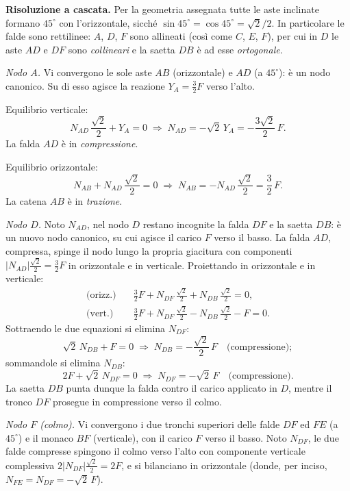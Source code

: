 \begin{esempio}
\begin{svolgimento}
		\noindent\textbf{Risoluzione a cascata.}
		Per la geometria assegnata tutte le aste inclinate
		formano $45^\circ$ con l'orizzontale, sicché
		$\sin 45^\circ = \cos 45^\circ = \sqrt2/2$. In
		particolare le falde sono rettilinee: $A$, $D$, $F$
		sono allineati (così come $C$, $E$, $F$), per cui in
		$D$ le aste $AD$ e $DF$ sono \emph{collineari} e la
		saetta $DB$ è ad esse \emph{ortogonale}.
		
		\textit{Nodo $A$.}
		Vi convergono le sole aste $AB$ (orizzontale) e
		$AD$ (a $45^\circ$): è un nodo canonico. Su di esso
		agisce la reazione $Y_A = \tfrac{3}{2}F$ verso l'alto.
		
		Equilibrio verticale:
		\[
		N_{AD}\,\frac{\sqrt2}{2} + Y_A = 0
		\;\Rightarrow\;
		N_{AD} = -\sqrt2\,Y_A
		= -\frac{3\sqrt2}{2}\,F.
		\]
		La falda $AD$ è in \emph{compressione}.
		
		Equilibrio orizzontale:
		\[
		N_{AB} + N_{AD}\,\frac{\sqrt2}{2} = 0
		\;\Rightarrow\;
		N_{AB} = -N_{AD}\,\frac{\sqrt2}{2}
		= \frac{3}{2}\,F.
		\]
		La catena $AB$ è in \emph{trazione}.
		
		\textit{Nodo $D$.}
		Noto $N_{AD}$, nel nodo $D$ restano incognite la
		falda $DF$ e la saetta $DB$: è un nuovo nodo canonico,
		su cui agisce il carico $F$ verso il basso. La falda
		$AD$, compressa, spinge il nodo lungo la propria
		giacitura con componenti
		$\lvert N_{AD}\rvert \tfrac{\sqrt2}{2} = \tfrac{3}{2}F$
		in orizzontale e in verticale. Proiettando in
		orizzontale e in verticale:
		\[
		\begin{aligned}
			\text{(orizz.)}\quad
			&\tfrac{3}{2}F + N_{DF}\,\tfrac{\sqrt2}{2}
			+ N_{DB}\,\tfrac{\sqrt2}{2} = 0,\\[2pt]
			\text{(vert.)}\quad
			&\tfrac{3}{2}F + N_{DF}\,\tfrac{\sqrt2}{2}
			- N_{DB}\,\tfrac{\sqrt2}{2} - F = 0.
		\end{aligned}
		\]
		Sottraendo le due equazioni si elimina $N_{DF}$:
		\[
		\sqrt2\,N_{DB} + F = 0
		\;\Rightarrow\;
		N_{DB} = -\frac{\sqrt2}{2}\,F
		\quad\text{(compressione)};
		\]
		sommandole si elimina $N_{DB}$:
		\[
		2F + \sqrt2\,N_{DF} = 0
		\;\Rightarrow\;
		N_{DF} = -\sqrt2\,F
		\quad\text{(compressione)}.
		\]
		La saetta $DB$ punta dunque la falda contro il carico
		applicato in $D$, mentre il tronco $DF$ prosegue in
		compressione verso il colmo.
		
		\textit{Nodo $F$ (colmo).}
		Vi convergono i due tronchi superiori delle falde
		$DF$ ed $FE$ (a $45^\circ$) e il monaco $BF$
		(verticale), con il carico $F$ verso il basso. Noto
		$N_{DF}$, le due falde compresse spingono il colmo
		verso l'alto con componente verticale complessiva
		$2 \lvert N_{DF}\rvert \tfrac{\sqrt2}{2} = 2F$, e si
		bilanciano in orizzontale (donde, per inciso,
		$N_{FE} = N_{DF} = -\sqrt2\,F$).
		

\end{svolgimento}
\end{esempio}
